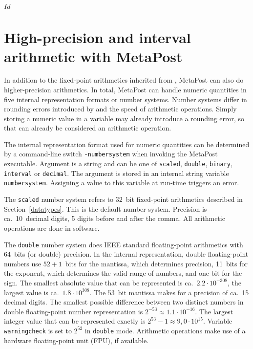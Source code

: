 \svnInfo $Id$
\section{High-precision and interval arithmetic with MetaPost}
\label{hparith}

In addition to the fixed-point arithmetics inherited from \MF, MetaPost
can also do higher-precision arithmetics.  In total, MetaPost can handle
numeric quantities in five internal representation formats or number
systems.  Number systems differ in rounding errors
introduced by and the speed of arithmetic operations.  Simply storing a
numeric value in a variable may already introduce a rounding error, so
that can already be considered an arithmetic operation.

The internal representation format used for numeric quantities can be
determined by a command-line switch
\texttt{-numbersystem}
when invoking the MetaPost executable.  Argument is a string and can be
one of \texttt{scaled}, \texttt{double}, \texttt{binary}, \texttt{interval} or
\texttt{decimal}.  The argument is stored in an internal string variable
\texttt{numbersystem}\label{Dnumbersystem}.
Assigning a value to this variable at run-time triggers an error.

The \texttt{scaled} number system refers
to 32~bit fixed-point arithmetics described in Section~\ref{datatypes}.
This is the default number system.  Precision is ca.~10~decimal digits,
5 digits before and after the comma.  All arithmetic operations are done
in software.

The \texttt{double} number system does
IEEE standard floating-point arithmetics with 64~bits (or double)
precision.  In the internal representation, double floating-point
numbers use $52+1$~bits for the mantissa, which determines precision,
11~bits for the exponent, which determines the valid range of numbers,
and one bit for the sign.  The smallest absolute value that can be
represented is ca.~$2.2\cdot10^{-308}$, the largest value is
ca.~$1.8\cdot10^{308}$.  The 53~bit mantissa makes for a precision of
ca.~15 decimal digits.  The smallest possible difference between two
distinct numbers in double floating-point number representation is
$2^{-53} \approx 1.1\cdot10^{-16}$.  The largest integer value that can
be represented exactly is $2^{53}-1 \approx 9,0\cdot10^{15}$.  Variable
\texttt{warningcheck} is set
to $2^{52}$ in \texttt{double} mode.  Arithmetic operations make use of
a hardware floating-point unit (FPU), if available.


